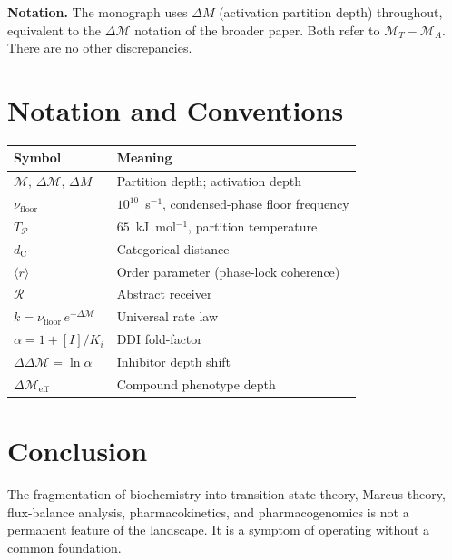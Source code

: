 \documentclass[11pt,twocolumn,a4paper]{article}
\theoremstyle{definition}
\theoremstyle{remark}
\newcommand{\Depth}{\mathcal{M}}
\newcommand{\Part}{\mathcal{P}}
\newcommand{\dC}{d_{\mathrm{C}}}
\newcommand{\orderpar}{\langle r \rangle}
\newcommand{\nufloor}{\nu_{\mathrm{floor}}}
\newcommand{\Tpart}{T_{\Part}}
\newcommand{\Recv}{\mathcal{R}}
\begin{document}
\textbf{Notation.}  The monograph uses $\Delta M$ (activation partition depth)
throughout, equivalent to the $\Delta\Depth$ notation of the broader paper.
Both refer to $\Depth_T - \Depth_A$.  There are no other discrepancies.

\section{Notation and Conventions}
\label{sec:notation}

\begin{center}
\begin{tabular}{lp{5.0cm}}
\toprule
Symbol & Meaning \\
\midrule
$\Depth,\,\Delta\Depth,\,\Delta M$ &
    Partition depth; activation depth \\
$\nufloor$ & $10^{10}$~s$^{-1}$, condensed-phase floor frequency \\
$\Tpart$   & $65$~kJ~mol$^{-1}$, partition temperature \\
$\dC$       & Categorical distance \\
$\orderpar$ & Order parameter (phase-lock coherence) \\
$\Recv$     & Abstract receiver \\
$k = \nufloor\,e^{-\Delta\Depth}$ & Universal rate law \\
$\alpha = 1 + [I]/K_i$ & DDI fold-factor \\
$\Delta\Delta\Depth = \ln\alpha$ & Inhibitor depth shift \\
$\Delta\Depth_{\mathrm{eff}}$ & Compound phenotype depth \\
\bottomrule
\end{tabular}
\end{center}

\section{Conclusion}
\label{sec:conclusion}

The fragmentation of biochemistry into transition-state theory, Marcus theory,
flux-balance analysis, pharmacokinetics, and pharmacogenomics is not a
permanent feature of the landscape.  It is a symptom of operating without a
common foundation.
\end{document}

